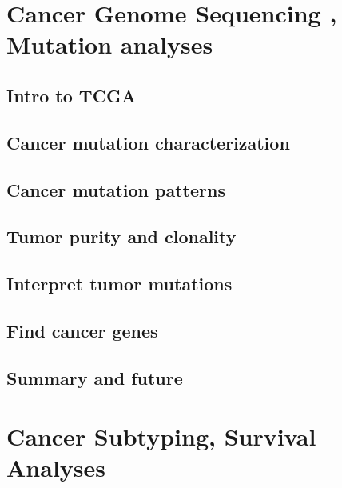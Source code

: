 \documentclass[]{book}
\begin{document}
\hypertarget{cancerseq}{%
\chapter{Cancer Genome Sequencing , Mutation analyses}\label{cancerseq}}

\hypertarget{intro-to-tcga}{%
\section{Intro to TCGA}\label{intro-to-tcga}}

\hypertarget{cancer-mutation-characterization}{%
\section{Cancer mutation characterization}\label{cancer-mutation-characterization}}

\hypertarget{cancer-mutation-patterns}{%
\section{Cancer mutation patterns}\label{cancer-mutation-patterns}}

\hypertarget{tumor-purity-and-clonality}{%
\section{Tumor purity and clonality}\label{tumor-purity-and-clonality}}

\hypertarget{interpret-tumor-mutations}{%
\section{Interpret tumor mutations}\label{interpret-tumor-mutations}}

\hypertarget{find-cancer-genes}{%
\section{Find cancer genes}\label{find-cancer-genes}}

\hypertarget{summary-and-future}{%
\section{Summary and future}\label{summary-and-future}}

\hypertarget{cancersub}{%
\chapter{Cancer Subtyping, Survival Analyses}\label{cancersub}}
\end{document}
